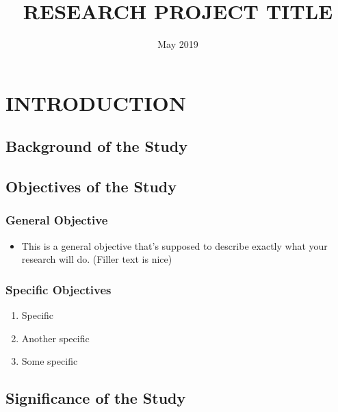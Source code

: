 \documentclass{strrespaper-trad}
\title{RESEARCH PROJECT TITLE} %
\date{May 2019} %
\begin{document}
	\maketitle

	\makeapprovalsheet


	\makeabstract{
        \lipsum[1-2]
    }

    \contents
    \listoflistings

	\mainmatter

	\section{INTRODUCTION}
		\subsection{Background of the Study}
            \lipsum[1]

		\subsection{Objectives of the Study}
			\subsubsection{General Objective}
				\begin{itemize}
					\item This is a general objective that's supposed to describe exactly what your research will do. (Filler text is nice)
				\end{itemize}
			\subsubsection{Specific Objectives}
				\begin{enumerate}
					\item Specific
					\item Another specific
					\item Some specific
				\end{enumerate}

		\subsection{Significance of the Study}
            \lipsum[2]
            
\end{document}
